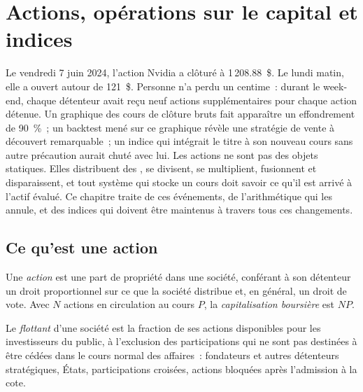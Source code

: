  \chapter{Actions, opérations sur le capital et indices}\label{ch:m1:shares-corporate-actions-indices}

Le vendredi 7 juin 2024, l'action Nvidia a clôturé à 1\,208.88~\$. Le lundi
matin, elle a ouvert autour de 121~\$. Personne n'a perdu un centime~: durant le week-end, chaque
détenteur avait reçu neuf actions supplémentaires pour chaque action détenue. Un graphique des
cours de clôture bruts fait apparaître un effondrement de 90~\%~; un backtest mené sur ce
graphique révèle une stratégie de vente à découvert remarquable~; un indice qui intégrait le
titre à son nouveau cours sans autre précaution aurait chuté avec lui.
Les actions ne sont pas des objets statiques. Elles distribuent des , se divisent, se multiplient, fusionnent et
disparaissent, et tout système qui stocke un cours doit savoir ce qu'il est arrivé à
l'actif évalué. Ce chapitre traite de ces événements, de l'arithmétique
qui les annule, et des indices qui doivent être maintenus à travers
tous ces changements.

\section{Ce qu'est une action}

\begin{definition}\label{def:m1:shares-corporate-actions-indices:share}
Une \emph{action} est une part de propriété dans une société, conférant à son
détenteur un droit proportionnel sur ce que la société distribue et, en général, un
droit de vote. Avec $N$ actions en circulation au cours $P$, la
\emph{capitalisation boursière} est $NP$.
\end{definition}

\begin{definition}[Flottant]\label{def:m1:shares-corporate-actions-indices:float}
Le \emph{flottant} d'une société est la fraction de ses
actions disponibles pour les investisseurs du public, à l'exclusion des participations
qui ne sont pas destinées à être cédées dans le cours normal des affaires~: fondateurs et autres
détenteurs stratégiques, États, participations croisées, actions bloquées après l'admission à la cote.
\end{definition}

